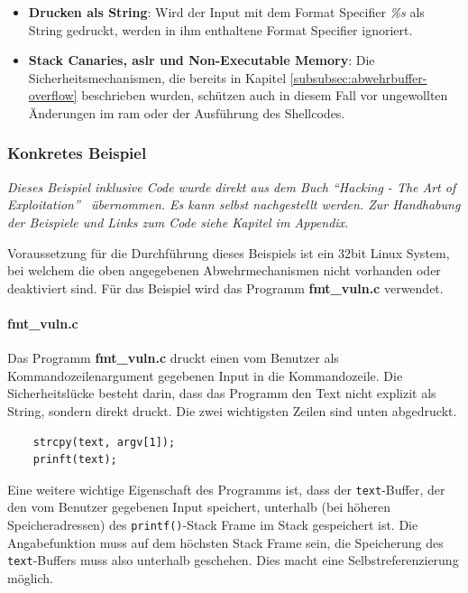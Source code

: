 \documentclass[11pt, a4paper]{article}
\begin{document}
\begin{itemize}
	\item \textbf{Drucken als String}: Wird der Input mit dem Format Specifier \textit{\%s} als String gedruckt, werden in ihm enthaltene Format Specifier ignoriert. 
	\item \textbf{Stack Canaries, \gls{aslr} und Non-Executable Memory}: Die Sicherheitsmechanismen, die bereits in Kapitel \ref{subsubsec:abwehrbuffer-overflow} beschrieben wurden, schützen auch in diesem Fall vor ungewollten Änderungen im \gls{ram} oder der Ausführung des Shellcodes.
\end{itemize} 

\subsubsection{Konkretes Beispiel}\label{subsubsec:bspprintf}
\textit{Dieses Beispiel inklusive Code wurde direkt aus dem Buch ``Hacking - The Art of Exploitation''~\cite{erickson2008hacking} übernommen. Es kann selbst nachgestellt werden. Zur Handhabung der Beispiele und Links zum Code siehe Kapitel  im Appendix.}

Voraussetzung für die Durchführung dieses Beispiels ist ein 32bit Linux System, bei welchem die oben angegebenen Abwehrmechanismen nicht vorhanden oder deaktiviert sind. Für das Beispiel wird das Programm \textbf{fmt\_vuln.c} verwendet. 

\paragraph{fmt\_vuln.c}
Das Programm \textbf{fmt\_vuln.c} druckt einen vom Benutzer als Kommandozeilenargument gegebenen Input in die Kommandozeile. Die Sicherheitslücke besteht darin, dass das Programm den Text nicht explizit als String, sondern direkt druckt. Die zwei wichtigsten Zeilen sind unten abgedruckt.

\begin{lstlisting}
	strcpy(text, argv[1]);
	prinft(text);
\end{lstlisting} 
Eine weitere wichtige Eigenschaft des Programms ist, dass der \texttt{text}-Buffer, der den vom Benutzer gegebenen Input speichert, unterhalb (bei höheren Speicheradressen) des \texttt{printf()}-Stack Frame im Stack gespeichert ist. Die Angabefunktion muss auf dem höchsten Stack Frame sein, die Speicherung des \texttt{text}-Buffers muss also unterhalb geschehen. Dies macht eine Selbstreferenzierung möglich.
\end{document}
